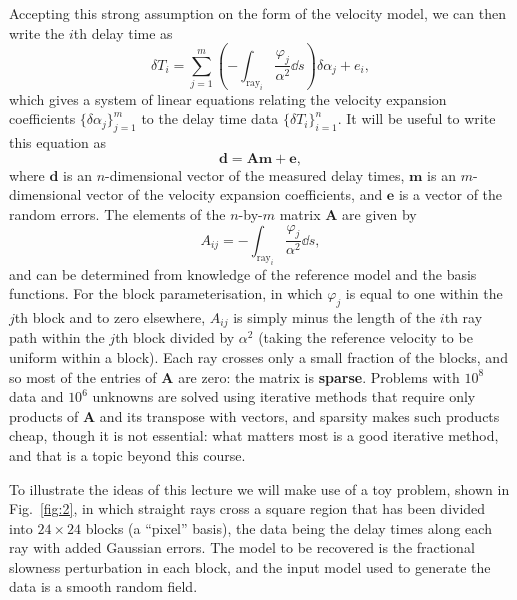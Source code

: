 Accepting this strong assumption on the form of the velocity model, we can then write the $i$th delay time as
\begin{equation}
    \delta T_{i} = \sum_{j=1}^{m} \left(-\int_{\mathrm{ray}_{i}} \frac{\varphi_{j}}{\alpha^{2}} \dd s \right) \delta\alpha_{j} + e_{i},
    \label{eq:9}
\end{equation}
which gives a system of linear equations relating the velocity expansion coefficients $\{\delta\alpha_{j}\}_{j=1}^{m}$ to the delay time data $\{\delta T_{i}\}_{i=1}^{n}$. It will be useful to write this equation as
\begin{equation}
    \mathbf{d} = \mathbf{A}\mathbf{m} + \mathbf{e},
    \label{eq:10}
\end{equation}
where $\mathbf{d}$ is an $n$-dimensional vector of the measured delay times, $\mathbf{m}$ is an $m$-dimensional vector of the 
velocity expansion coefficients, and $\mathbf{e}$ is a vector of the random errors. The elements of the $n$-by-$m$ matrix 
$\mathbf{A}$ are given by
\begin{equation}
    A_{ij} = -\int_{\mathrm{ray}_{i}} \frac{\varphi_{j}}{\alpha^{2}} \dd s,
    \label{eq:11}
\end{equation}
and can be determined from knowledge of the reference model and the basis functions. For the block parameterisation, in 
which $\varphi_{j}$ is equal to one within the $j$th block and to zero elsewhere, $A_{ij}$ is simply minus the length of the 
$i$th ray path within the $j$th block divided by $\alpha^{2}$ (taking the reference velocity to be uniform within a block). 
Each ray crosses only a small fraction of the blocks, and so most of the entries of $\mathbf{A}$ are zero: the matrix is 
\textbf{sparse}. Problems with $10^{8}$ data and $10^{6}$ unknowns are solved using iterative methods that require only 
products of $\mathbf{A}$ and its transpose with vectors, and sparsity makes such products cheap, though it is not essential: 
what matters most is a good iterative method, and that is a topic beyond this course.

To illustrate the ideas of this lecture we will make use of a toy problem, shown in Fig.~\ref{fig:2}, in which straight 
rays cross a square region that has been divided into $24\times24$ blocks (a ``pixel'' basis), the data being the delay 
times along each ray with added Gaussian errors. The model to be recovered is the fractional slowness perturbation in each 
block, and the input model used to generate the data is a smooth random field.

